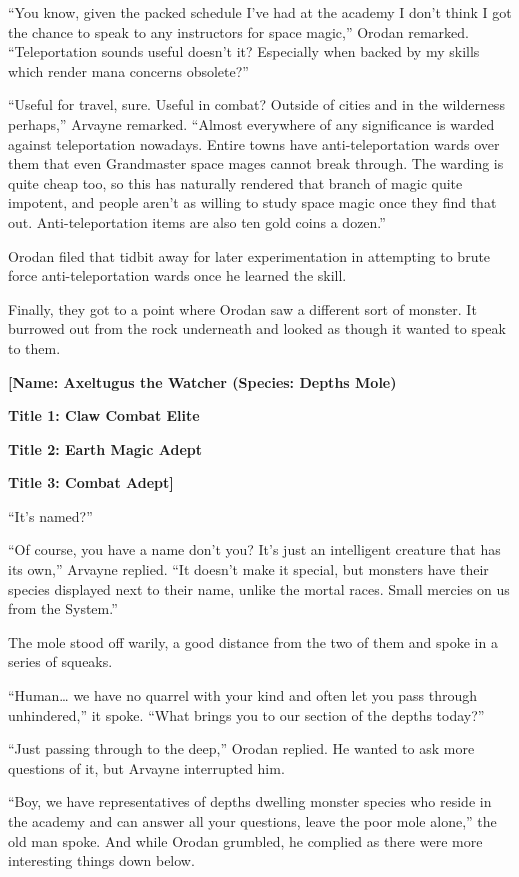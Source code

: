 \documentclass[a4paper,10pt]{book}
\begin{document}
“You know, given the packed schedule I’ve had at the academy I don’t think I got the chance to speak to any instructors for space magic,” Orodan remarked. “Teleportation sounds useful doesn’t it? Especially when backed by my skills which render mana concerns obsolete?”\par
“Useful for travel, sure. Useful in combat? Outside of cities and in the wilderness perhaps,” Arvayne remarked. “Almost everywhere of any significance is warded against teleportation nowadays. Entire towns have anti-teleportation wards over them that even Grandmaster space mages cannot break through. The warding is quite cheap too, so this has naturally rendered that branch of magic quite impotent, and people aren’t as willing to study space magic once they find that out. Anti-teleportation items are also ten gold coins a dozen.”\par
Orodan filed that tidbit away for later experimentation in attempting to brute force anti-teleportation wards once he learned the skill.\par
Finally, they got to a point where Orodan saw a different sort of monster. It burrowed out from the rock underneath and looked as though it wanted to speak to them.\par
\textbf{[Name: Axeltugus the Watcher (Species: Depths Mole)}\par
\textbf{Title 1: Claw Combat Elite}\par
\textbf{Title 2: Earth Magic Adept}\par
\textbf{Title 3: Combat Adept]}\par
“It’s named?”\par
“Of course, you have a name don’t you? It’s just an intelligent creature that has its own,” Arvayne replied. “It doesn’t make it special, but monsters have their species displayed next to their name, unlike the mortal races. Small mercies on us from the System.”\par
The mole stood off warily, a good distance from the two of them and spoke in a series of squeaks.\par
“Human… we have no quarrel with your kind and often let you pass through unhindered,” it spoke. “What brings you to our section of the depths today?”\par
“Just passing through to the deep,” Orodan replied. He wanted to ask more questions of it, but Arvayne interrupted him.\par
“Boy, we have representatives of depths dwelling monster species who reside in the academy and can answer all your questions, leave the poor mole alone,” the old man spoke. And while Orodan grumbled, he complied as there were more interesting things down below.\par
\end{document}
